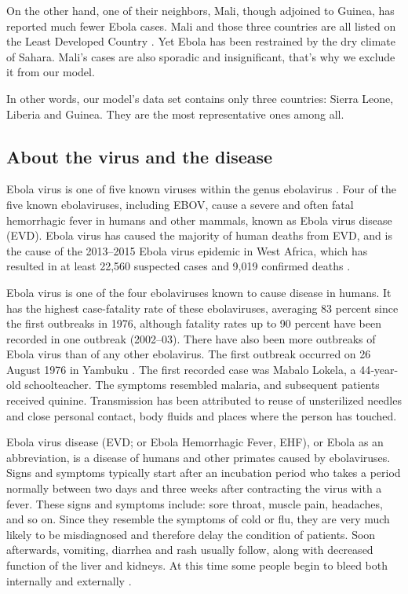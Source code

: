 \documentclass[12pt]{article}
\begin{document}
On the other hand, one of their neighbors, Mali, though adjoined to Guinea, has reported much fewer Ebola cases. Mali and those three countries are all listed on the Least Developed Country \cite{LeastDevelopedCountry}. Yet Ebola has been restrained by the dry climate of Sahara. Mali's cases are also sporadic and insignificant, that's why we exclude it from our model.

In other words, our model's data set contains only three countries: Sierra Leone, Liberia and Guinea. They are the most representative ones among all.

\subsection{About the virus and the disease}%

Ebola virus is one of five known viruses within the genus ebolavirus \cite{Ebolavirus}. Four of the five known ebolaviruses, including EBOV, cause a severe and often fatal hemorrhagic fever in humans and other mammals, known as Ebola virus disease (EVD). Ebola virus has caused the majority of human deaths from EVD, and is the cause of the 2013–2015 Ebola virus epidemic in West Africa, which has resulted in at least 22,560 suspected cases and 9,019 confirmed deaths \cite{NumOfCases}.

Ebola virus is one of the four ebolaviruses known to cause disease in humans. It has the highest case-fatality rate of these ebolaviruses, averaging 83 percent since the first outbreaks in 1976, although fatality rates up to 90 percent have been recorded in one outbreak (2002–03). There have also been more outbreaks of Ebola virus than of any other ebolavirus. The first outbreak occurred on 26 August 1976 in Yambuku \cite{FirstOutbreak}. The first recorded case was Mabalo Lokela, a 44‑year-old schoolteacher. The symptoms resembled malaria, and subsequent patients received quinine. Transmission has been attributed to reuse of unsterilized needles and close personal contact, body fluids and places where the person has touched.

Ebola virus disease (EVD; or Ebola Hemorrhagic Fever, EHF), or Ebola as an abbreviation, is a disease of humans and other primates caused by ebolaviruses. Signs and symptoms typically start after an incubation period who takes a period normally between two days and three weeks after contracting the virus with a fever. These signs and symptoms include: sore throat, muscle pain, headaches, and so on. Since they resemble the symptoms of cold or flu, they are very much likely to be misdiagnosed and therefore delay the condition of patients. Soon afterwards, vomiting, diarrhea and rash usually follow, along with decreased function of the liver and kidneys. At this time some people begin to bleed both internally and externally \cite{Ebolavirusdisease}.
\end{document}

